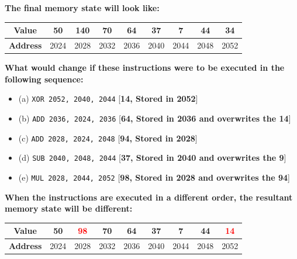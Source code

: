 \textbf{The final memory state will look like:}

\begin{center}
\begin{tabular}{|c|c|c|c|c|c|c|c|c|}
\hline
\textbf{Value} & 50 & 140 & 70 & 64 & 37 & 7 & 44 & 34 \\
\hline
\textbf{Address} & 2024 & 2028 & 2032 & 2036 & 2040 & 2044 & 2048 & 2052 \\
\hline
\end{tabular}
\end{center}

\textbf{What would change if these instructions were to be executed in the following sequence:}

\begin{itemize}
  \item (a) \texttt{XOR 2052, 2040, 2044} \hfill [\textbf{14, Stored in 2052}]
  \item (b) \texttt{ADD 2036, 2024, 2036} \hfill [\textbf{64, Stored in 2036 and overwrites the 14}]
  \item (c) \texttt{ADD 2028, 2024, 2048} \hfill [\textbf{94, Stored in 2028}]
  \item (d) \texttt{SUB 2040, 2048, 2044} \hfill [\textbf{37, Stored in 2040 and overwrites the 9}]
  \item (e) \texttt{MUL 2028, 2044, 2052} \hfill [\textbf{98, Stored in 2028 and overwrites the 94}]
\end{itemize}

\textbf{When the instructions are executed in a different order, the resultant memory state will be different:}

\begin{center}
\begin{tabular}{|c|c|c|c|c|c|c|c|c|}
\hline
\textbf{Value} & 50 & \textcolor{red}{98} & 70 & 64 & 37 & 7 & 44 & \textcolor{red}{14} \\
\hline
\textbf{Address} & 2024 & 2028 & 2032 & 2036 & 2040 & 2044 & 2048 & 2052 \\
\hline
\end{tabular}
\end{center}

